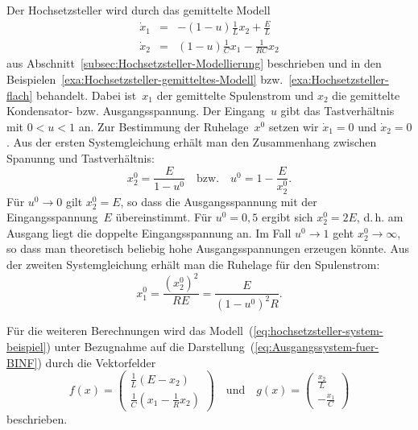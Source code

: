 Der Hochsetzsteller wird durch das gemittelte
Modell 
\begin{equation}
\begin{array}{lcl}
\dot{x}_{1} & = & -(1-u)\frac{1}{L}x_{2}+\frac{E}{L}\\
\dot{x}_{2} & = & (1-u)\frac{1}{C}x_{1}-\frac{1}{RC}x_{2}
\end{array}\label{eq:hochsetzsteller-system-beispiel}
\end{equation}
aus Abschnitt~\ref{subsec:Hochsetzsteller-Modellierung} beschrieben
und in den Beispielen~\ref{exa:Hochsetzsteller-gemitteltes-Modell}
bzw.~\ref{exa:Hochsetzsteller-flach} behandelt. Dabei ist~$x_{1}$
der gemittelte Spulenstrom und $x_{2}$ die gemittelte Kondensator-
bzw. Ausgangsspannung. Der Eingang~$u$ gibt das Tastverhältnis mit
$0<u<1$ an. Zur Bestimmung der Ruhelage~$x^{0}$ setzen wir $\dot{x}_{1}=0$
und $\dot{x}_{2}=0$. Aus der ersten Systemgleichung erhält man den
Zusammenhang zwischen Spanunng und Tastverhältnis: 
\begin{equation}
x_{2}^{0}=\frac{E}{1-u^{0}}\quad\text{bzw.}\quad u^{0}=1-\frac{E}{x_{2}^{0}}.\label{eq:hochsetzsteller-ruhelage-x2}
\end{equation}
Für $u^{0}\to0$ gilt $x_{2}^{0}=E$, so dass die Ausgangsspannung
mit der Eingangs\-spannung~$E$ übereinstimmt. Für $u^{0}=0,5$
ergibt sich $x_{2}^{0}=2E$, d.\,h. am Ausgang liegt die doppelte
Eingangsspannung an. Im Fall $u^{0}\to1$ geht $x_{2}^{0}\to\infty$,
so dass man theoretisch beliebig hohe Ausgangsspannungen erzeugen
könnte. Aus der zweiten Systemgleichung erhält man die Ruhelage für
den Spulenstrom: 
\begin{equation}
x_{1}^{0}=\frac{(x_{2}^{0})^{2}}{RE}=\frac{E}{(1-u^{0})^{2}R}.\label{eq:hochsetzsteller-ruhelage-x1}
\end{equation}

Für die weiteren Berechnungen wird das Modell~(\ref{eq:hochsetzsteller-system-beispiel})
unter Bezugnahme auf die Darstellung~(\ref{eq:Ausgangssystem-fuer-BINF})
durch die Vektorfelder 
\[
f(x)=\left(\begin{array}{c}
\frac{1}{L}(E-x_{2})\\
\frac{1}{C}(x_{1}-\frac{1}{R}x_{2})
\end{array}\right)\quad\text{und}\quad g(x)=\left(\begin{array}{r}
\frac{x_{2}}{L}\\
-\frac{x_{1}}{C}
\end{array}\right)
\]
beschrieben.

